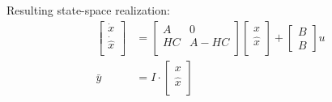 Resulting state-space realization:
\begin{equation*}
    \begin{aligned}
        \begin{bmatrix}
            \dot{x}       \\
            \dot{\hat{x}} \\
        \end{bmatrix}
                & = \begin{bmatrix}
            A  & 0    \\
            HC & A-HC \\
        \end{bmatrix}\begin{bmatrix}
            x       \\
            \hat{x} \\
        \end{bmatrix} + \begin{bmatrix}
            B \\
            B
        \end{bmatrix} u \\
        \bar{y} & = I \cdot \begin{bmatrix}
            x       \\
            \hat{x} \\
        \end{bmatrix}
    \end{aligned}
\end{equation*}

